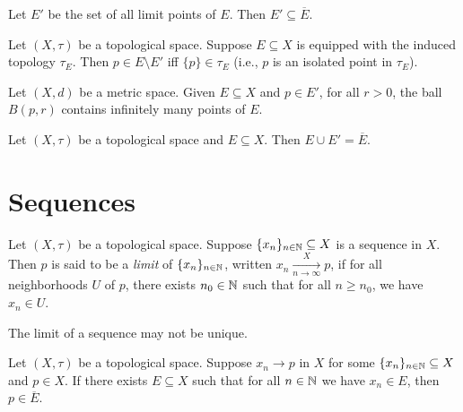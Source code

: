 \documentclass{techreport}
\begin{document}
\begin{remark}\label{Rem:LimitContainedInClosure}
	Let $E'$ be the set of all limit points of $E$.
	Then $E' \subseteq \overline{E}$.
\end{remark}

\begin{proposition}\label{Prop:NonLimitIsIsolated}
	Let $(X,\tau)$ be a topological space.
	Suppose $E \subseteq X$ is equipped with the induced topology $\tau_E$.
	Then $p \in E \setminus E'$ iff $\{p\} \in \tau_E$ (i.e., $p$ is an isolated point in $\tau_E$).
\end{proposition}

\begin{proposition}\label{Prop:BallOfLimitContainInfinite}
	Let $(X,d)$ be a metric space.
	Given $E \subseteq X$ and $p \in E'$, for all $r > 0$, the ball $B(p,r)$ contains infinitely many points of $E$.
\end{proposition}

\begin{proposition}\label{Prop:OrigPlusLimitIsClosure}
	Let $(X,\tau)$ be a topological space and $E \subseteq X$.
	Then $E \cup E' = \overline{E}$.
\end{proposition}

\section{Sequences}

\begin{definition}\label{De:Sequences}
	Let $(X,\tau)$ be a topological space.
	Suppose $\{x_n\}_{n \in \mathbb{N}} \subseteq X$ is a sequence in $X$.
	Then $p$ is said to be a \emph{limit} of $\{x_n\}_{n \in \mathbb{N}}$, written $x_n \xrightarrow[n \to \infty]{X} p$, if for all neighborhoods $U$ of $p$, there exists $n_0 \in \mathbb{N}$ such that for all $n \ge n_0$, we have $x_n \in U$.
\end{definition}

\begin{remark}\label{Rem:LimitOfSeqNotUnique}
	The limit of a sequence may not be unique.
\end{remark}

\begin{lemma}\label{Lem:LimitOfSeqInClosure}
	Let $(X,\tau)$ be a topological space.
	Suppose $x_n \rightarrow p$ in $X$ for some $\{x_n\}_{n \in \mathbb{N}} \subseteq X$ and $p \in X$.
	If there exists $E \subseteq X$ such that for all $n \in \mathbb{N}$ we have $x_n \in E$, then $p \in \overline{E}$.
\end{lemma}
\end{document}
